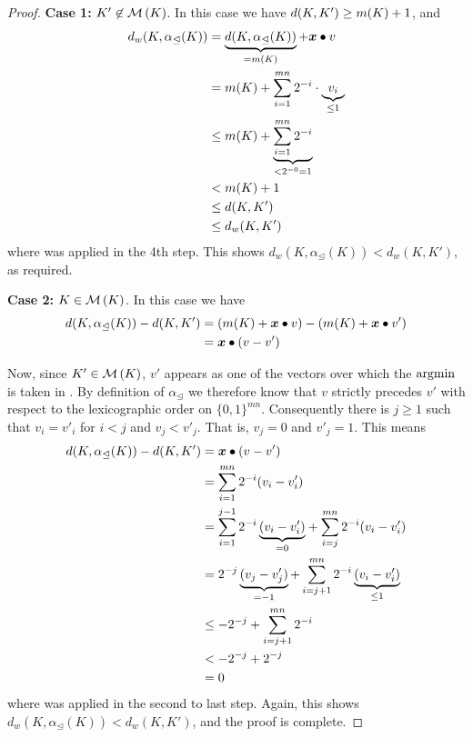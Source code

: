 \begin{proof}
    \textbf{Case 1:} $K' \not\in \operatorname{\mathcal{M}}\left({K}\right)$. In this case we have $d(K, K')
    \ge m({K}) + 1$, and
    \begin{align*}
       d_w(K, \alpha_{\trianglelefteq}(K))
       &=
           \underbrace{d(K, \alpha_{\trianglelefteq}(K))}_{= m({K})}
           +
           \bm{x} \bullet v \\
       &= m({K}) + \sum_{i=1}^{mn}{2^{-i} \cdot \underbrace{v_i}_{\le 1}}
       \\
       &\le m({K}) + \underbrace{\sum_{i=1}^{mn}{2^{-i}}}_{< 2^{-0} = 1}
       \\
       &< m({K}) + 1 \\
       &\le d(K, K') \\
       &\le d_w(K, K')
    \end{align*}
    where  was applied in the 4th step. This shows $d_w(K,
    \alpha_{\trianglelefteq}(K)) < d_w(K, K')$, as required.

    \textbf{Case 2:} $K \in \operatorname{\mathcal{M}}\left({K}\right)$. In this case we have
    \begin{align*}
       d(K, \alpha_{\trianglelefteq}(K)) - d(K, K')
       &= (m({K}) + \bm{x} \bullet v)
          -
          (m({K}) + \bm{x} \bullet v') \\
       &= \bm{x} \bullet (v - v')
    \end{align*}

    Now, since $K' \in \operatorname{\mathcal{M}}\left({K}\right)$, $v'$ appears as one of the vectors over
    which the $\operatorname{argmin}$ is taken in
    . By definition of
    $\alpha_{\trianglelefteq}$ we therefore know that $v$ strictly precedes
    $v'$ with respect to the lexicographic order on $\{0,1\}^{mn}$.
    Consequently there is $j \ge 1$ such that $v_i = v'_i$ for $i < j$ and $v_j
    < v'_j$. That is, $v_j = 0$ and $v'_j = 1$. This means
    \begin{align*}
       d(K, \alpha_{\trianglelefteq}(K)) - d(K, K')
       &= \bm{x} \bullet (v - v') \\
       &= \sum_{i=1}^{mn}{2^{-i}(v_i - v'_i)} \\
       &= \sum_{i=1}^{j-1}{2^{-i}\underbrace{(v_i - v'_i)}_{=0}}
          +
          \sum_{i=j}^{mn}{2^{-i}(v_i - v'_i)} \\
       &= 2^{-j}\underbrace{(v_j - v'_j)}_{=-1}
          + \sum_{i=j + 1}^{mn}{
               2^{-i}
               \underbrace{(v_i - v'_i)}_{\le 1}
            } \\
       &\le -2^{-j}
            + \sum_{i=j+1}^{mn}{
                  2^{-i}
              } \\
       &< -2^{-j} + 2^{-j} \\
       &= 0
    \end{align*}
    where  was applied in the second to last step.
    Again, this shows $d_w(K, \alpha_{\trianglelefteq}(K)) < d_w(K, K')$, and
    the proof is complete.
\end{proof}


